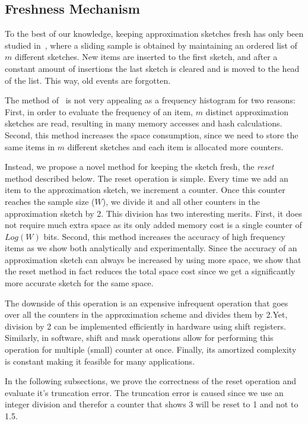 \documentclass[10pt,a4paper]{article}
\begin{document}
\subsection{Freshness Mechanism}
To the best of our knowledge, keeping approximation sketches fresh has only been studied in~\cite{SUNSHINE}, where a sliding sample is obtained by maintaining an ordered list of $m$ different sketches.
New items are inserted to the first sketch, and after a constant amount of insertions the last sketch is cleared and is moved to the head of the list.
This way, old events are forgotten. 

The method of~\cite{SUNSHINE} is not very appealing as a frequency histogram for two reasons:
First, in order to evaluate the frequency of an item, $m$ distinct approximation sketches are read, resulting in many memory accesses and hash calculations.
Second, this method increases the space consumption, since we need to store the same items in $m$ different sketches and each item is allocated more counters.

Instead, we propose a novel method for keeping the sketch fresh, the \emph{reset} method described below.
The reset operation is simple. Every time we add an item to the approximation sketch, we increment a counter.
Once this counter reaches the sample size ($W$), we divide it and all other counters in the approximation sketch by 2.
This division has two interesting merits. First, it does not require much extra space as its only added memory cost is a single counter of $Log(W)$ bits.
Second, this method increases the accuracy of high frequency items as we show both analytically and experimentally. Since the accuracy of an approximation
sketch can always be increased by using more space, we show that the reset method in fact reduces the total space cost since we get a significantly more
accurate sketch for the same space.

The downside of this operation is an expensive infrequent operation that goes over all the counters in the approximation scheme and divides them by 2.Yet, division by 2 can be implemented efficiently in hardware using shift registers.
Similarly, in software, shift and mask operations allow for performing this operation for multiple (small) counter at once. Finally, its amortized complexity is constant making it feasible for many applications.


In the following subsections, we prove the correctness of the reset operation and evaluate it's truncation error. The truncation error is caused since we use an integer division and therefor a counter that shows 3 will be reset to 1 and not to 1.5.
\end{document}
